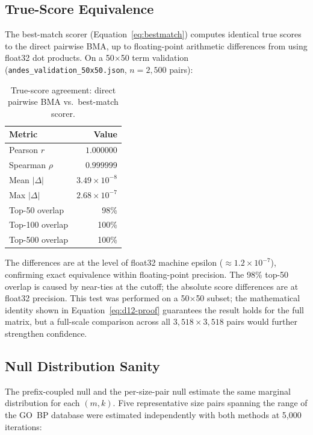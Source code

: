 \documentclass[11pt,a4paper]{article}
\begin{document}
\subsection{True-Score Equivalence}

The best-match scorer (Equation~\ref{eq:bestmatch}) computes identical true
scores to the direct pairwise BMA, up to floating-point arithmetic differences
from using float32 dot products. On a 50$\times$50 term validation
(\texttt{andes\_validation\_50x50.json}, $n = 2{,}500$ pairs):

\begin{table}[H]
	\centering
	\caption{True-score agreement: direct pairwise BMA vs.\ best-match scorer.}
	\smallskip
	\begin{tabular}{@{}lr@{}}
		\toprule
		Metric          & Value                 \\
		\midrule
		Pearson $r$     & $1.000000$            \\
		Spearman $\rho$ & $0.999999$            \\
		Mean $|\Delta|$ & $3.49 \times 10^{-8}$ \\
		Max $|\Delta|$  & $2.68 \times 10^{-7}$ \\
		Top-50 overlap  & 98\%                  \\
		Top-100 overlap & 100\%                 \\
		Top-500 overlap & 100\%                 \\
		\bottomrule
	\end{tabular}
\end{table}

The differences are at the level of float32 machine epsilon
($\approx 1.2 \times 10^{-7}$), confirming exact equivalence within
floating-point precision. The 98\% top-50 overlap is caused by near-ties at
the cutoff; the absolute score differences are at float32 precision. This
test was performed on a 50$\times$50 subset; the mathematical identity shown
in Equation~\ref{eq:d12-proof} guarantees the result holds for the full
matrix, but a full-scale comparison across all $3{,}518 \times 3{,}518$
pairs would further strengthen confidence.

\subsection{Null Distribution Sanity}

The prefix-coupled null and the per-size-pair null estimate the same marginal
distribution for each $(m,k)$. Five representative size pairs spanning the
range of the GO~BP database were estimated independently with both methods at
	5{,}000 iterations:
\end{document}
